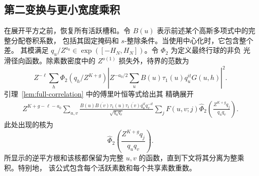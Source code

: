 \documentclass[11pt,a4paper]{article}
\numberwithin{equation}{section}
\numberwithin{figure}{section}
\theoremstyle{definition}
\theoremstyle{remark}
\begin{document}
\subsection{第二变换与更小宽度乘积}\label{sec:plain-second-transform}在展开平方之前，恢复所有活跃槽和。令
\(B(u)\) 表示前述某个高斯多项式中的完整分配卷积系数，
包括其固定掩码和 \(s\)-整除条件。当使用中心化时，它包含整个差。
其模满足
\(q_u/Z^{a_0}\in\exp([-H_N,H_N])\)。令 \(\Phi_2\) 为定义最终行球的非负
光滑径向函数。除素数密度中的 \(Z^{o(1)}\) 损失外，待界的范数为
\[
 Z^{-\ell}\sum_h\Phi_2(q_h/Z^{K+g})
 \left|Z^{-a_0/2}\sum_u B(u)\tau_1(u)q_u^{it}G(u,h)\right|^2.
\]
引理~\ref{lem:full-correlation} 中的傅里叶恒等式给出其
精确展开
\[
 \begin{split}
 Z^{K+g-\ell-a_0}\sum_{u,v}
 \frac{B(u)\overline{B(v)}\tau_1(u)\overline{\tau_1(v)}
       q_u^{it}q_v^{-it}}{\sqrt{q_uq_v}}
 \sum_j F(u,v;j)
 \widehat\Phi_2\left(\frac{Z^{K+g}q_j}{q_uq_v}\right).
 \end{split}
\]
此处出现的核为
\begin{equation}
 \widehat\Phi_2\left(\frac{Z^{K+g}q_j}{q_uq_v}\right).
 \label{old-eq:2.18b}
\end{equation}
所显示的逆平方根和该核都保留为完整 \(u,v\) 的函数，直到下文将其分离为整乘积。特别地，
该公式包含每个活跃素数和每个共享素数重数。
\end{document}
